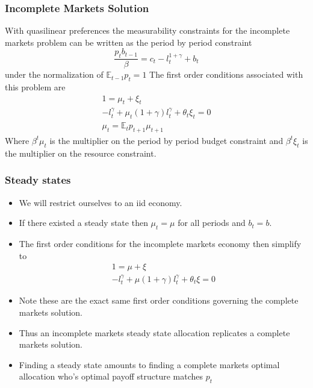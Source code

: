 \documentclass{beamer}
\newcommand{\EE}{\mathbb E}
\begin{document}
\begin{frame}
 	\frametitle{Incomplete Markets Solution}
	With quasilinear preferences the measurability constraints for the incomplete markets problem can be written as the period by period constraint
	\[
		\frac{p_t b_{t-1}}\beta = c_t - l_t^{1+\gamma} + b_t 
	\]under the normalization of $\EE_{t-1} p_t = 1$  The first order conditions associated with this problem are
	\begin{align*}
		1 = \mu_t + \xi_t\\
		-l_t^\gamma+\mu_t(1+\gamma)l_t^\gamma+\theta_t\xi_t = 0\\
		\mu_t = \EE_t p_{t+1}\mu_{t+1}
	\end{align*}  Where $\beta^t\mu_t$ is the multiplier on the period by period budget constraint and $\beta^t\xi_t$ is the multiplier on the resource constraint.
\end{frame}


\begin{frame}
 \frametitle{Steady states}
\begin{itemize}
	\item  We will restrict ourselves to an iid economy.
	\item  If there existed a steady state then $\mu_t = \mu$ for all periods and $b_t = b$.
	\item  The first order conditions for the incomplete markets economy then simplify to
	\begin{align*}
		 1 = \mu+ \xi\\
		-l_t^\gamma + \mu(1+\gamma)l_t^\gamma +\theta_t\xi = 0
	\end{align*}
	\item  Note these are the exact same first order conditions governing the complete markets solution.
	\item  Thus an incomplete markets steady state allocation replicates a complete markets solution. 
	\item  Finding a steady state amounts to finding a complete markets optimal allocation who's optimal payoff structure matches $p_t$
\end{itemize}
\end{frame}
\end{document}
